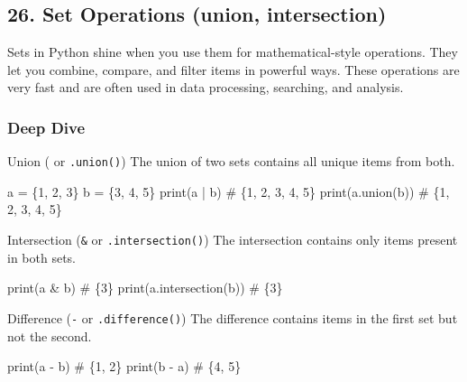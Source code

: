 \documentclass[
  letterpaper,
  DIV=11,
  numbers=noendperiod]{scrreprt}
\newenvironment{Shaded}{\begin{snugshade}}{\end{snugshade}}
\newcommand{\BuiltInTok}[1]{\textcolor[rgb]{0.00,0.23,0.31}{#1}}
\newcommand{\CommentTok}[1]{\textcolor[rgb]{0.37,0.37,0.37}{#1}}
\newcommand{\DecValTok}[1]{\textcolor[rgb]{0.68,0.00,0.00}{#1}}
\newcommand{\NormalTok}[1]{\textcolor[rgb]{0.00,0.23,0.31}{#1}}
\newcommand{\OperatorTok}[1]{\textcolor[rgb]{0.37,0.37,0.37}{#1}}
\begin{document}
\subsection{26. Set Operations (union,
intersection)}\label{set-operations-union-intersection}

Sets in Python shine when you use them for mathematical-style
operations. They let you combine, compare, and filter items in powerful
ways. These operations are very fast and are often used in data
processing, searching, and analysis.

\subsubsection{Deep Dive}\label{deep-dive-26}

Union (\texttt{\textbar{}} or \texttt{.union()}) The union of two sets
contains all unique items from both.

\begin{Shaded}
\begin{Highlighting}[]
\NormalTok{a }\OperatorTok{=}\NormalTok{ \{}\DecValTok{1}\NormalTok{, }\DecValTok{2}\NormalTok{, }\DecValTok{3}\NormalTok{\}}
\NormalTok{b }\OperatorTok{=}\NormalTok{ \{}\DecValTok{3}\NormalTok{, }\DecValTok{4}\NormalTok{, }\DecValTok{5}\NormalTok{\}}
\BuiltInTok{print}\NormalTok{(a }\OperatorTok{|}\NormalTok{ b)           }\CommentTok{\# \{1, 2, 3, 4, 5\}}
\BuiltInTok{print}\NormalTok{(a.union(b))      }\CommentTok{\# \{1, 2, 3, 4, 5\}}
\end{Highlighting}
\end{Shaded}

Intersection (\texttt{\&} or \texttt{.intersection()}) The intersection
contains only items present in both sets.

\begin{Shaded}
\begin{Highlighting}[]
\BuiltInTok{print}\NormalTok{(a }\OperatorTok{\&}\NormalTok{ b)           }\CommentTok{\# \{3\}}
\BuiltInTok{print}\NormalTok{(a.intersection(b))  }\CommentTok{\# \{3\}}
\end{Highlighting}
\end{Shaded}

Difference (\texttt{-} or \texttt{.difference()}) The difference
contains items in the first set but not the second.

\begin{Shaded}
\begin{Highlighting}[]
\BuiltInTok{print}\NormalTok{(a }\OperatorTok{{-}}\NormalTok{ b)           }\CommentTok{\# \{1, 2\}}
\BuiltInTok{print}\NormalTok{(b }\OperatorTok{{-}}\NormalTok{ a)           }\CommentTok{\# \{4, 5\}}
\end{Highlighting}
\end{Shaded}
\end{document}
